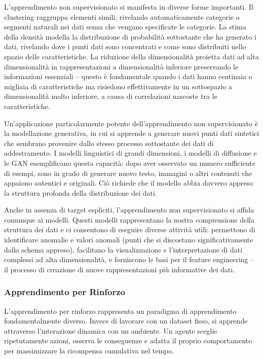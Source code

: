 L'apprendimento non supervisionato si manifesta in diverse forme importanti. Il \alert{clustering} raggruppa elementi simili, rivelando automaticamente categorie o segmenti naturali nei dati senza che vengano specificate le categorie. La \alert{stima della densità} modella la distribuzione di probabilità sottostante che ha generato i dati, rivelando dove i punti dati sono concentrati e come sono distribuiti nello spazio delle caratteristiche. La \alert{riduzione della dimensionalità} proietta dati ad alta dimensionalità in rappresentazioni a dimensionalità inferiore preservando le informazioni essenziali -- questo è fondamentale quando i dati hanno centinaia o migliaia di caratteristiche ma risiedono effettivamente in un sottospazio a dimensionalità molto inferiore, a causa di correlazioni nascoste tra le caratteristiche.

Un'applicazione particolarmente potente dell'apprendimento non supervisionato è la \alert{modellazione generativa}, in cui si apprende a generare nuovi punti dati sintetici che sembrano provenire dallo stesso processo sottostante dei dati di addestramento. I modelli linguistici di grandi dimensioni, i modelli di diffusione e le GAN esemplificano questa capacità: dopo aver osservato un numero sufficiente di esempi, sono in grado di generare nuovo testo, immagini o altri contenuti che appaiono autentici e originali. Ciò richiede che il modello abbia davvero appreso la struttura profonda della distribuzione dei dati.

Anche in assenza di target espliciti, l'apprendimento non supervisionato si affida comunque ai modelli. Questi modelli rappresentano la nostra comprensione della struttura dei dati e ci consentono di eseguire diverse attività utili: permettono di identificare anomalie e valori anomali (punti che si discostano significativamente dallo schema appreso), facilitano la visualizzazione e l'interpretazione di dati complessi ad alta dimensionalità, e forniscono le basi per il feature engineering -- il processo di creazione di nuove rappresentazioni più informative dei dati.

\subsubsection*{Apprendimento per Rinforzo}

L'apprendimento per rinforzo rappresenta un paradigma di apprendimento fondamentalmente diverso. Invece di lavorare con un dataset fisso, si apprende attraverso l'interazione dinamica con un ambiente. Un agente sceglie ripetutamente azioni, osserva le conseguenze e adatta il proprio comportamento per massimizzare la ricompensa cumulativa nel tempo.


